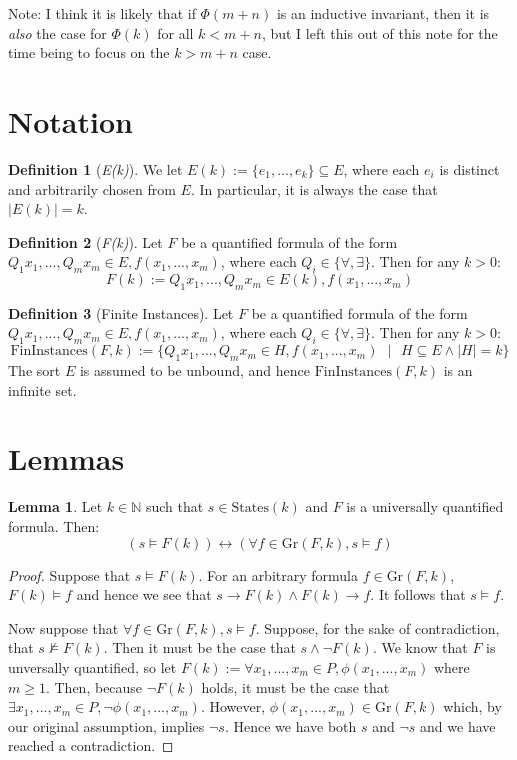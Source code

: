 \documentclass[12pt]{article}
\theoremstyle{definition}
\newtheorem{lemma}{Lemma}
\newtheorem{definition}{Definition}
\theoremstyle{remark}
\newcommand{\st}{\text{ }|\text{ }}
\newcommand{\states}{\text{States}}
\newcommand{\gr}{\text{Gr}}
\newcommand{\fininstances}{\text{FinInstances}}
\begin{document}
Note: I think it is likely that if $\Phi(m+n)$ is an inductive invariant, then it is \textit{also} the case for $\Phi(k)$ for all $k<m+n$, but I left this out of this note for the time being to focus on the $k>m+n$ case.



\section{Notation}
\begin{definition}[\textit{E(k)}]
  We let $E(k) := \{e_1,...,e_k\} \subseteq E$, where each $e_i$ is distinct and arbitrarily chosen from $E$.  In particular, it is always the case that $|E(k)|=k$.
\end{definition}

\begin{definition}[\textit{F(k)}]
  Let $F$ be a quantified formula of the form $Q_1 x_1,...,Q_m x_m \in E, f(x_1,...,x_m)$, where each $Q_i \in \{\forall,\exists\}$.  Then for any $k>0$:
  $$F(k) := Q_1 x_1,...,Q_m x_m \in E(k), f(x_1,...,x_m)$$
\end{definition}

\begin{definition}[Finite Instances]
  Let $F$ be a quantified formula of the form $Q_1 x_1,...,Q_m x_m \in E, f(x_1,...,x_m)$, where each $Q_i \in \{\forall,\exists\}$.  Then for any $k>0$:
  $$\fininstances(F,k) := \{Q_1 x_1,...,Q_m x_m \in H, f(x_1,...,x_m) \st H \subseteq E \land |H|=k\}$$
  The sort $E$ is assumed to be unbound, and hence $\fininstances(F,k)$ is an infinite set.
\end{definition}



\section{Lemmas}
\begin{lemma}
  \label{lem:pnf-ground}
  Let $k \in \mathbb{N}$ such that $s \in \states(k)$ and $F$ is a universally quantified formula.  Then:
  $$(s \models F(k)) \leftrightarrow (\forall f \in \gr(F,k), s \models f)$$
\end{lemma}
\begin{proof}
  Suppose that $s \models F(k)$.  For an arbitrary formula $f \in \gr(F,k)$, $F(k) \models f$ and hence we see that $s \rightarrow F(k) \land F(k) \rightarrow f$.  It follows that $s \models f$.

  Now suppose that $\forall f \in \gr(F,k), s \models f$.  Suppose, for the sake of contradiction, that $s \not\models F(k)$.  Then it must be the case that $s \land \neg F(k)$.  We know that $F$ is unversally quantified, so let $F(k) := \forall x_1,...,x_m \in P, \phi(x_1,...,x_m)$ where $m \geq 1$.  Then, because $\neg F(k)$ holds, it must be the case that $\exists x_1,...,x_m \in P, \neg \phi(x_1,...,x_m)$.  However, $\phi(x_1,...,x_m) \in \gr(F,k)$ which, by our original assumption, implies $\neg s$.  Hence we have both $s$ and $\neg s$ and we have reached a contradiction.
\end{proof}
\end{document}
